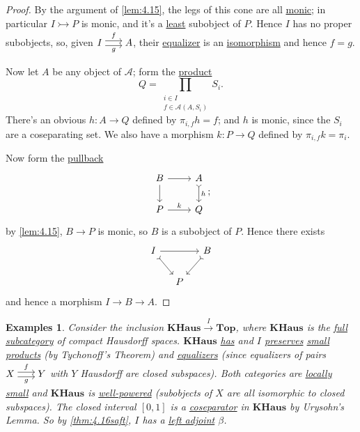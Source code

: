 \documentclass{article}
\newenvironment{tikzcdi}{\begin{tikzcd}[cramped, sep=scriptsize]}{\end{tikzcd}}
\let\to\longrightarrow
\newtheorem{nexample}[nthm]{Examples}
\begin{document}
\begin{proof}
  By the argument of \cref{lem:4.15}, the legs of this cone are all \hyperlink{def:monic}{monic}; in particular $I \rightarrowtail P$ is monic, and it's a \hyperlink{def:subobj}{least} subobject of $P$.
  Hence $I$ has no proper subobjects,
  so, given $\begin{tikzcdi}I \rar[shift left]{f} \rar[shift right,']{g} & A\end{tikzcdi}$, their \hyperlink{def:equalizer}{equalizer} is an \hyperlink{def:iso}{isomorphism} and hence $f = g$.

  Now let $A$ be any object of $\mathscr{A}$; form the \hyperlink{def:lprod}{product}
  \begin{equation*}
    Q = \prod_{\substack{i \in I \\ f \in \mathscr{A}(A,S_i)}} S_i.
  \end{equation*}
  There's an obvious $h: A \to Q$ defined by $\pi_{i,f} h = f$; and $h$ is monic, since the $S_i$ are a coseparating set.
  We also have a morphism $k : P \to Q$ defined by $\pi_{i,f} k = \pi_i$.

  Now form the \hyperlink{def:pullback}{pullback}
  \begin{equation*}
    \begin{tikzcd}
      B \rar \dar & A \dar[tail]{h} \\ P \rar{k} & Q
    \end{tikzcd};
  \end{equation*}
  by \cref{lem:4.15}, $B \to P$ is monic, so $B$ is a subobject of $P$.
  Hence there exists
  \begin{equation*}
    \begin{tikzcd}[column sep=small]
      I \arrow[rr] \drar[tail] && B \arrow[dl, tail] \\
                               & P
    \end{tikzcd}
  \end{equation*}
  and hence a morphism $I \to B \to A$.
\end{proof}
\begin{nexample}\label{eg:4.17}
  Consider the inclusion $\mathbf{KHaus} \overset{I}\to \mathbf{Top}$, where $\mathbf{KHaus}$ is the \hyperlink{def:fulls}{full subcategory} of compact Hausdorff spaces.
  $\mathbf{KHaus}$ \hyperlink{def:haslimits}{has} and $I$ \hyperlink{def:plim}{preserves} \hyperlink{def:small}{small} \hyperlink{def:lprod}{products} (by Tychonoff's Theorem) and \hyperlink{def:equalizer}{equalizers} (since equalizers of pairs $\begin{tikzcdi}X \rar[shift left]{f} \rar[shift right,']{g} & Y\end{tikzcdi}$ with $Y$ Hausdorff are closed subspaces).
  Both categories are \hyperlink{def:lsmall}{locally small} and $\mathbf{KHaus}$ is \hyperlink{def:wp}{well-powered} (subobjects of $X$ are all isomorphic to closed subspaces).
  The closed interval $[0,1]$ is a \hyperlink{def:separating}{coseparator} in $\mathbf{KHaus}$ by Urysohn's Lemma.
  So by \cref{thm:4.16saft}, $I$ has a \hyperlink{def:adj}{left adjoint} $\beta$.
\end{nexample}
\end{document}
